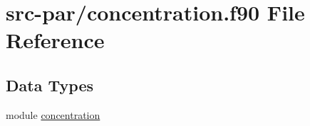 \hypertarget{concentration_8f90}{\section{src-\/par/concentration.f90 File Reference}
\label{concentration_8f90}
}
\subsection*{Data Types}
\begin{DoxyCompactItemize}
\item 
module \hyperlink{classconcentration}{concentration}
\end{DoxyCompactItemize}
